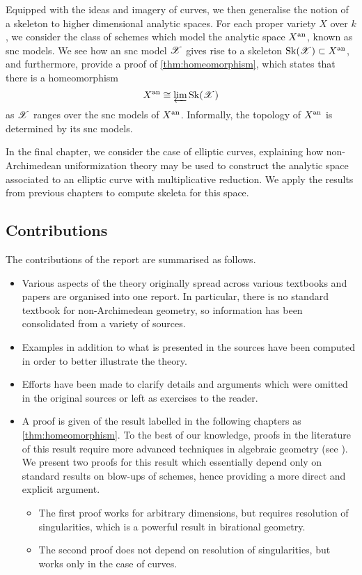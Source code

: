 Equipped with the ideas and imagery of curves, we then generalise the notion of a skeleton to higher dimensional analytic spaces.
For each proper variety $X$ over $k$, we consider the class of schemes which model the analytic space $X^{\text{an}}$, known as snc models.
We see how an snc model $\mathscr{X}$ gives rise to a skeleton $\operatorname{Sk}(\mathscr{X}) \subset X^{\text{an}}$, and furthermore, provide a proof of \cref{thm:homeomorphism}, which states that there is a homeomorphism
\[
    X^{\text{an}} \cong \varprojlim \operatorname{Sk}(\mathscr{X})
\]
as $\mathscr{X}$ ranges over the snc models of $X^{\text{an}}$.
Informally, the topology of $X^{\text{an}}$ is determined by its snc models.

In the final chapter, we consider the case of elliptic curves, explaining how non-Archimedean uniformization theory may be used to construct the analytic space associated to an elliptic curve with multiplicative reduction.
We apply the results from previous chapters to compute skeleta for this space.

\subsection{Contributions}

The contributions of the report are summarised as follows.
\begin{itemize}
    \item Various aspects of the theory originally spread across various textbooks and papers are organised into one report.
    In particular, there is no standard textbook for non-Archimedean geometry, so information has been consolidated from a variety of sources.
    \item Examples in addition to what is presented in the sources have been computed in order to better illustrate the theory.
    \item Efforts have been made to clarify details and arguments which were omitted in the original sources or left as exercises to the reader.
    \item A proof is given of the result labelled in the following chapters as \cref{thm:homeomorphism}. 
    To the best of our knowledge, proofs in the literature of this result require more advanced techniques in algebraic geometry  (see \parencite{bfj}).
    We present two proofs for this result which essentially depend only on standard results on blow-ups of schemes, hence providing a more direct and explicit argument.
        \begin{itemize}
            \item The first proof works for arbitrary dimensions, but requires resolution of singularities, which is a powerful result in birational geometry.
            \item The second proof does not depend on resolution of singularities, but works only in the case of curves.
        \end{itemize}
\end{itemize}

